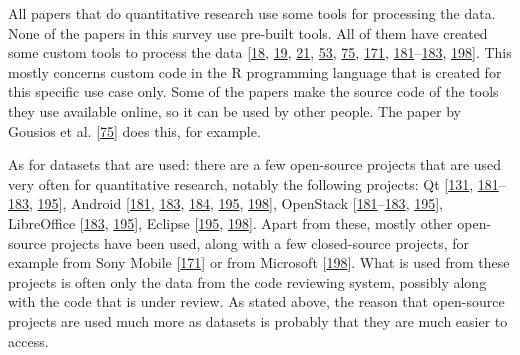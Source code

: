 \documentclass[]{book}
\begin{document}
All papers that do quantitative research use some tools for processing
the data. None of the papers in this survey use pre-built tools. All of
them have created some custom tools to process the data
{[}\protect\hyperlink{ref-baysal2016investigating}{18},
\protect\hyperlink{ref-baysal2013influence}{19},
\protect\hyperlink{ref-beller2014modern}{21},
\protect\hyperlink{ref-czerwonka2015code}{53},
\protect\hyperlink{ref-gousios2014exploratory}{75},
\protect\hyperlink{ref-shimagaki2016study}{171},
\protect\hyperlink{ref-thongtanunam2017review}{181}--\protect\hyperlink{ref-thongtanunam2015should}{183},
\protect\hyperlink{ref-zanjani2016automatically}{198}{]}. This mostly
concerns custom code in the R programming language that is created for
this specific use case only. Some of the papers make the source code of
the tools they use available online, so it can be used by other people.
The paper by Gousios et al.
{[}\protect\hyperlink{ref-gousios2014exploratory}{75}{]} does this, for
example.

As for datasets that are used: there are a few open-source projects that
are used very often for quantitative research, notably the following
projects: Qt {[}\protect\hyperlink{ref-mcintosh2014impact}{131},
\protect\hyperlink{ref-thongtanunam2017review}{181}--\protect\hyperlink{ref-thongtanunam2015should}{183},
\protect\hyperlink{ref-yang2016mining}{195}{]}, Android
{[}\protect\hyperlink{ref-thongtanunam2017review}{181},
\protect\hyperlink{ref-thongtanunam2015should}{183},
\protect\hyperlink{ref-thongtanunam2014reda}{184},
\protect\hyperlink{ref-yang2016mining}{195},
\protect\hyperlink{ref-zanjani2016automatically}{198}{]}, OpenStack
{[}\protect\hyperlink{ref-thongtanunam2017review}{181}--\protect\hyperlink{ref-thongtanunam2015should}{183},
\protect\hyperlink{ref-yang2016mining}{195}{]}, LibreOffice
{[}\protect\hyperlink{ref-thongtanunam2015should}{183},
\protect\hyperlink{ref-yang2016mining}{195}{]}, Eclipse
{[}\protect\hyperlink{ref-yang2016mining}{195},
\protect\hyperlink{ref-zanjani2016automatically}{198}{]}. Apart from
these, mostly other open-source projects have been used, along with a
few closed-source projects, for example from Sony Mobile
{[}\protect\hyperlink{ref-shimagaki2016study}{171}{]} or from Microsoft
{[}\protect\hyperlink{ref-zanjani2016automatically}{198}{]}. What is
used from these projects is often only the data from the code reviewing
system, possibly along with the code that is under review. As stated
above, the reason that open-source projects are used much more as
datasets is probably that they are much easier to access.
\end{document}
